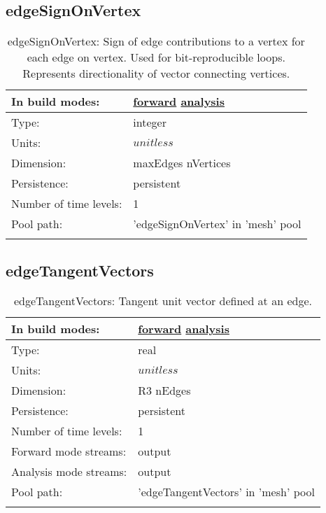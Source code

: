 \subsection[edgeSignOnVertex]{edgeSignOnVertex}
\label{subsec:var_sec_mesh_edgeSignOnVertex}
\begin{center}
\begin{longtable}{| p{2.0in} | p{4.0in} |}
        \hline 
        In build modes: & \hyperref[subsec:forward_var_tab_mesh]{forward} \hyperref[subsec:analysis_var_tab_mesh]{analysis} \\
        \hline 
        Type: & integer \\
        \hline 
        Units: & $unitless$ \\
        \hline 
        Dimension: & maxEdges nVertices \\
        \hline 
        Persistence: & persistent \\
        \hline 
        Number of time levels: & 1 \\
        \hline 
            Pool path: & 'edgeSignOnVertex' in 'mesh' pool
 \\
		 \hline 
    \caption{edgeSignOnVertex: Sign of edge contributions to a vertex for each edge on vertex. Used for bit-reproducible loops. Represents directionality of vector connecting vertices.}
\end{longtable}
\end{center}
\subsection[edgeTangentVectors]{edgeTangentVectors}
\label{subsec:var_sec_mesh_edgeTangentVectors}
\begin{center}
\begin{longtable}{| p{2.0in} | p{4.0in} |}
        \hline 
        In build modes: & \hyperref[subsec:forward_var_tab_mesh]{forward} \hyperref[subsec:analysis_var_tab_mesh]{analysis} \\
        \hline 
        Type: & real \\
        \hline 
        Units: & $unitless$ \\
        \hline 
        Dimension: & R3 nEdges \\
        \hline 
        Persistence: & persistent \\
        \hline 
        Number of time levels: & 1 \\
        \hline 
		 Forward mode streams: &  output \\
        \hline 
		 Analysis mode streams: &  output \\
        \hline 
            Pool path: & 'edgeTangentVectors' in 'mesh' pool
 \\
		 \hline 
    \caption{edgeTangentVectors: Tangent unit vector defined at an edge.}
\end{longtable}
\end{center}
